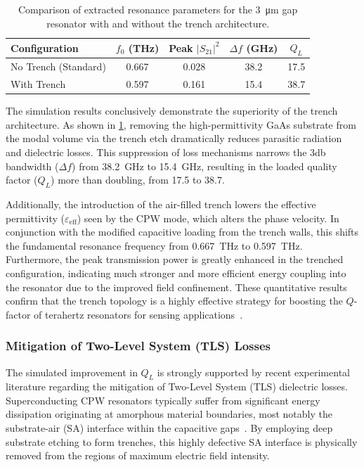 \documentclass[12pt,a4paper]{article}
\begin{document}
\begin{table}[htbp]
    \centering
    \caption{Comparison of extracted resonance parameters for the \SI{3}{\micro\metre} gap resonator with and without the trench architecture.}
    \label{tab:trench_comparison}
    \begin{tabular}{lcccc}
        \toprule
        Configuration & $f_0$ (\si{\tera\hertz}) & Peak $|S_{21}|^2$ & $\Delta f$ (\si{\giga\hertz}) & $Q_L$ \\
        \midrule
        No Trench (Standard) & 0.667 & 0.028 & 38.2 & 17.5 \\
        With Trench          & 0.597 & 0.161 & 15.4 & 38.7 \\
        \bottomrule
    \end{tabular}
\end{table}

The simulation results conclusively demonstrate the superiority of the trench architecture. As shown in \cref{tab:trench_comparison}, removing the high-permittivity GaAs substrate from the modal volume via the trench etch dramatically reduces parasitic radiation and dielectric losses. This suppression of loss mechanisms narrows the 3\unit{\decibel} bandwidth ($\Delta f$) from \SI{38.2}{\giga\hertz} to \SI{15.4}{\giga\hertz}, resulting in the loaded quality factor ($Q_L$) more than doubling, from 17.5 to 38.7. 

Additionally, the introduction of the air-filled trench lowers the effective permittivity ($\varepsilon_{\mathrm{eff}}$) seen by the CPW mode, which alters the phase velocity. In conjunction with the modified capacitive loading from the trench walls, this shifts the fundamental resonance frequency from \SI{0.667}{\tera\hertz} to \SI{0.597}{\tera\hertz}. Furthermore, the peak transmission power is greatly enhanced in the trenched configuration, indicating much stronger and more efficient energy coupling into the resonator due to the improved field confinement. These quantitative results confirm that the trench topology is a highly effective strategy for boosting the $Q$-factor of terahertz resonators for sensing applications~\cite{Saleh2026, Calusine2018}. 

\subsubsection{Mitigation of Two-Level System (TLS) Losses}

The simulated improvement in $Q_L$ is strongly supported by recent experimental literature regarding the mitigation of Two-Level System (TLS) dielectric losses. Superconducting CPW resonators typically suffer from significant energy dissipation originating at amorphous material boundaries, most notably the substrate-air (SA) interface within the capacitive gaps~\cite{Saleh2026, Bruno2015}. By employing deep substrate etching to form trenches, this highly defective SA interface is physically removed from the regions of maximum electric field intensity.
\end{document}
